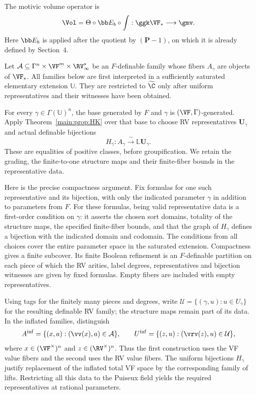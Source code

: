 \begin{nota}\label{mov:vol}
The motivic volume operator is
\[
 \Vol=\Theta\circ\bb E_b\circ\int:
 \ggk\VF_*\longrightarrow\gmv .
\]
Here $\bb E_b$ is applied after the quotient by $(\bm P-1)$,
on which it is already defined by Section~4.
\end{nota}

Let $\mathcal A\subseteq\Gamma^n\times\VF^m\times\RV_\infty^s$
be an $F$-definable family whose fibers $A_\gamma$ are objects
of $\VF_*$. All families below are first interpreted in a
sufficiently saturated elementary extension $\mathbb U$.
They are restricted to $\widetilde{\C}$ only after uniform
representatives and their witnesses have been obtained.

For every $\gamma\in\Gamma(\mathbb U)^n$,
the base generated by $F$ and $\gamma$ is
$(\VF,\Gamma)$-generated. Apply Theorem~\ref{main:prop:HK}{} over that
base to choose RV representatives $\bm U_\gamma$ and actual
definable bijections
\[
 H_\gamma:A_\gamma\xrightarrow{\ \sim\ }\mathbb L\bm U_\gamma.
\]
These are equalities of positive classes, before groupification.
We retain the grading, the finite-to-one structure maps and
their finite-fiber bounds in the representative data.

Here is the precise compactness argument. Fix formulas for one
such representative and its bijection, with only the indicated
parameter $\gamma$ in addition to parameters from $F$.
For these formulas, being valid representative data is a
first-order condition on $\gamma$: it asserts the chosen sort
domains, totality of the structure maps, the specified finite-fiber
bounds, and that the graph of $H_\gamma$ defines a bijection with
the indicated domain and codomain.
The conditions from all choices cover the entire parameter
space in the saturated extension. Compactness gives a finite
subcover. Its finite Boolean refinement is an $F$-definable
partition on each piece of which the RV arities, label degrees,
representatives and bijection witnesses are given by fixed
formulas. Empty fibers are included with empty representatives.

Using tags for the finitely many pieces and degrees, write
$\mathcal U=\{(\gamma,u):u\in U_\gamma\}$ for the resulting
definable RV family; the structure maps remain part of its data.
In the inflated families, distinguish
\[
 A^{\mathrm{inf}}
   =\{(x,a):(\vv(x),a)\in\mathcal A\},
 \qquad
 U^{\mathrm{inf}}
   =\{(z,u):(\vrv(z),u)\in\mathcal U\},
\]
where $x\in(\VF^\times)^n$ and $z\in(\RV^\times)^n$.
Thus the first construction uses the VF value fibers and the
second uses the RV value fibers. The uniform bijections
$H_\gamma$ justify replacement of the inflated total VF space
by the corresponding family of lifts. Restricting all this
data to the Puiseux field yields the required representatives
at rational parameters.


